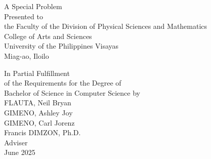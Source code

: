 \begin{titlepage}
\centering


\vspace{0.875cm}
A Special Problem\\
Presented to\\
the Faculty of the Division of Physical Sciences and Mathematics\\
College of Arts and Sciences\\
University of the Philippines Visayas\\
Miag-ao, Iloilo

\vspace{0.875cm}
In Partial Fulfillment\\
of the Requirements for the Degree of\\
Bachelor of Science in Computer Science
\vspace{1.75cm}
by\\

\vspace{0.1cm}
FLAUTA, Neil Bryan  \\
GIMENO, Ashley Joy  \\
GIMENO, Carl Jorenz  \\

\vspace{0.875cm}
Francis DIMZON, Ph.D. \\
Adviser\\


\vspace{0.875cm}
June 2025
\end{titlepage}
